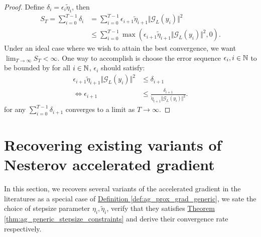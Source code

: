 \documentclass[12pt]{article}
\begin{document}
\begin{proof}
        Define $\delta_i = \epsilon_{i} \tilde \eta_i$, then 
        \begin{align*}
            S_{T} = 
            \sum_{i = 0}^{T- 1} \delta_i 
            &= 
            \sum_{i = 0}^{T - 1} \epsilon_{i + 1}\tilde\eta_{i + 1}\Vert \mathcal G_L(y_i)\Vert^2
            \\
            &\le \sum_{i = 0}^{T - 1}\max(\epsilon_{i + 1} \tilde\eta_{i + 1}\Vert \mathcal G_L(y_i)\Vert^2, 0). 
        \end{align*}
        Under an ideal case where we wish to attain the best convergence, we want $\lim_{T \rightarrow \infty} S_T < \infty$. 
        One way to accomplish is choose the error sequence $\epsilon_i, i \in \mathbb N$ to be bounded by for all $i \in \mathbb N$, $\epsilon_i$ should satisfy: 
        \begin{align*}
            \epsilon_{i + 1}\tilde \eta_{i + 1}
            \Vert \mathcal G_L(y_i)\Vert^2 
            &\le \delta_{i + 1}
            \\
            \iff 
            \epsilon_{i + 1}
            &\le 
            \frac{\delta_{i + 1} }{\tilde\eta_{t + 1}\Vert \mathcal G_L(y_i)\Vert^2}. 
        \end{align*}
        for any $\sum_{i = 0}^{T - 1}\delta_{i + 1}$ converges to a limit as $T \rightarrow \infty$. 

    \end{proof}

\section{Recovering existing variants of Nesterov accelerated gradient}\label{sec:recovery}
    In this section, we recovers several variants of the accelerated gradient in the literatures as a special case of 
    \hyperref[def:ag_prox_grad_generic]{Definition \ref*{def:ag_prox_grad_generic}}, 
    we sate the choice of stepsize parameter $\eta_i, \tilde \eta_i$, verify that they satisfies 
    \hyperref[thm:ag_generic_stepsize_constraints]
    {Theorem \ref*{thm:ag_generic_stepsize_constraints}}
    and derive their convergence rate respectively. 
    
\end{document}
